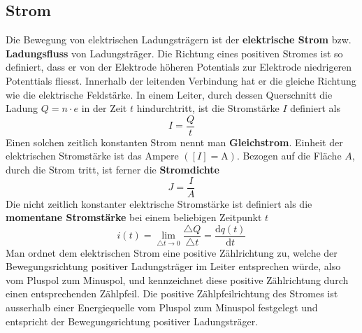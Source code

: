 \subsection{Strom}
Die Bewegung von elektrischen Ladungsträgern ist der \textbf{elektrische Strom} bzw. \textbf{Ladungsfluss} von Ladungsträger. Die Richtung eines positiven Stromes ist so definiert, dass er von der Elektrode höheren Potentials zur Elektrode niedrigeren Potenttials fliesst. Innerhalb der leitenden Verbindung hat er die gleiche Richtung wie die elektrische Feldstärke. In einem Leiter, durch dessen Querschnitt die Ladung $Q=n\cdot e$ in der Zeit $t$ hindurchtritt, ist die Stromstärke $I$ definiert als
\begin{equation}
\boxed{I=\dfrac{Q}{t}}
\end{equation}
Einen solchen zeitlich konstanten Strom nennt man \textbf{Gleichstrom}. Einheit der elektrischen Stromstärke ist das Ampere $([I]=\text{A})$. Bezogen auf die Fläche $A$, durch die Strom tritt, ist ferner die \textbf{Stromdichte}
\begin{equation}
\boxed{J=\dfrac{I}{A}}
\end{equation}
Die nicht zeitlich konstanter elektrische Stromstärke ist definiert als die \textbf{momentane Stromstärke} bei einem beliebigen Zeitpunkt $t$
\begin{equation}
\boxed{i\left(t\right)=\displaystyle \lim_{\triangle t\rightarrow 0}\dfrac{\triangle Q}{\triangle t}=\dfrac{\text{d}q\left(t\right)}{\text{d}t}}
\end{equation}
Man ordnet dem elektrischen Strom eine positive Zählrichtung zu, welche der Bewegungsrichtung positiver Ladungsträger im Leiter entsprechen würde, also vom Pluspol zum Minuspol, und kennzeichnet diese positive Zählrichtung durch einen entsprechenden Zählpfeil.
\newline\newline
Die positive Zählpfeilrichtung des Stromes ist ausserhalb einer Energiequelle vom Pluspol zum Minuspol festgelegt und entspricht der Bewegungsrichtung positiver Ladungsträger.
